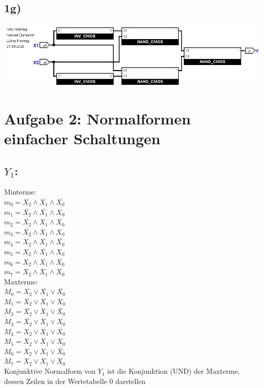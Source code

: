 \documentclass[]{article}
\newcommand{\V}{\lor}
\newcommand{\A}{\land}
\newcommand{\T}[1]{\overline{#1}}
\begin{document}
\subsection*{1g)}
	\begin{center}\includegraphics[scale=0.45]{Bilder/1_g.png}\end{center}


\section*{Aufgabe 2: Normalformen einfacher Schaltungen}
	\subsection*{$Y_1$:}
	Minterme:\\
	$m_0 = \T{X_2} \A \T{X_1} \A \T{X_0}$\\
	$m_1 = \T{X_2} \A \T{X_1} \A 	X_0$\\
	$m_2 = \T{X_2} \A     X_1 \A \T{X_0}$\\
	$m_3 = \T{X_2} \A     X_1 \A    X_0$\\
	$m_4 =     X_2 \A \T{X_1} \A \T{X_0}$\\
	$m_5 =     X_2 \A \T{X_1} \A    X_0$\\
	$m_6 =     X_2 \A     X_1 \A \T{X_0}$\\
	$m_7 =     X_2 \A     X_1 \A    X_0$\\


	Maxterme:\\
	$M_0 = \T{X_2} \V \T{X_1} \V \T{X_0}$\\
	$M_1 = \T{X_2} \V \T{X_1} \V 	X_0$\\
	$M_2 = \T{X_2} \V 	  X_1 \V \T{X_0}$\\
	$M_3 = \T{X_2} \V     X_1 \V    X_0$\\
	$M_4 =     X_2 \V \T{X_1} \V \T{X_0}$\\
	$M_5 =     X_2 \V \T{X_1} \V    X_0$\\
	$M_6 =     X_2 \V     X_1 \V \T{X_0}$\\
	$M_7 =     X_2 \V     X_1 \V    X_0$\\


	Konjunktive Normalform von $Y_1$ ist die Konjunktion (UND) der Maxterme, dessen Zeilen in der Wertetabelle $0$ darstellen\\
\end{document}
